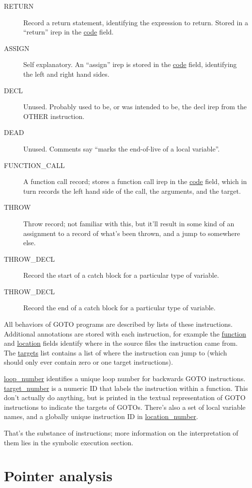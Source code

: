 \documentclass{article}
\begin{document}
\begin{description}
\item[RETURN] Record a return statement, identifying the expression to return.
Stored in a ``return'' irep in the \url{code} field.
\item[ASSIGN] Self explanatory. An ``assign'' irep is stored in the
\url{code} field, identifying the left and right hand sides.
\item[DECL] Unused. Probably used to be, or was intended to be, the decl
irep from the OTHER instruction.
\item[DEAD] Unused. Comments say ``marks the end-of-live of a local variable''.
\item[FUNCTION\_CALL] A function call record; stores a function call irep in
the \url{code} field, which in turn records the left hand side of the call,
the arguments, and the target.
\item[THROW] Throw record; not familiar with this, but it'll result in some
kind of an assignment to a record of what's been thrown, and a jump to somewhere
else.
\item[THROW\_DECL] Record the start of a catch block for a particular type
of variable.
\item[THROW\_DECL] Record the end of a catch block for a particular type
of variable.
\end{description}

All behaviors of GOTO programs are described by lists of these instructions.
Additional annotations are stored with each instruction, for example the
\url{function} and \url{location} fields identify where in the source
files the instruction came from. The \url{targets} list contains a list
of where the instruction can jump to (which should only ever contain zero or
one target instructions).

\url{loop_number} identifies a unique loop number for backwards
GOTO instructions. \url{target_number} is a numeric ID that labels
the instruction within a function. This don't actually do anything, but
is printed in the textual representation of GOTO instructions to indicate
the targets of GOTOs.  There's also a set of local variable names, and
a globally unique instruction ID in \url{location_number}.

That's the substance of instructions; more information on the interpretation
of them lies in the symbolic execution section.

\section{Pointer analysis}
\end{document}
